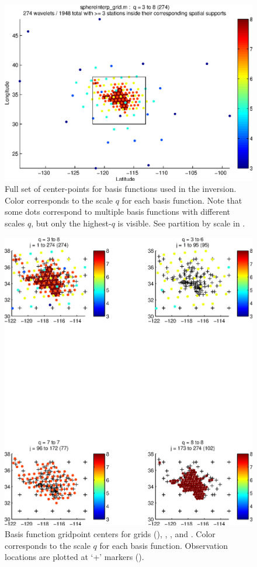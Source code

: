\documentclass[11pt,titlepage,fleqn]{article}
\begin{document}
\begin{figure}
\includegraphics[width=16cm]{fig1D_2.eps}
\caption[]
{{
Full set of center-points for basis functions used in the inversion.
Color corresponds to the scale $q$ for each basis function.
Note that some dots correspond to multiple basis functions with different scales $q$, but only the highest-$q$ is visible.
See partition by scale in .
\label{fig:1D_2}
}}
\end{figure}

\begin{figure}
\includegraphics[width=16cm]{fig1D_3.eps}
\caption[]
{{
Basis function gridpoint centers for grids  (), , , and .
Color corresponds to the scale $q$ for each basis function.
Observation locations are plotted at `+' markers ().
\label{fig:1D_3}
}}
\end{figure}
\end{document}
